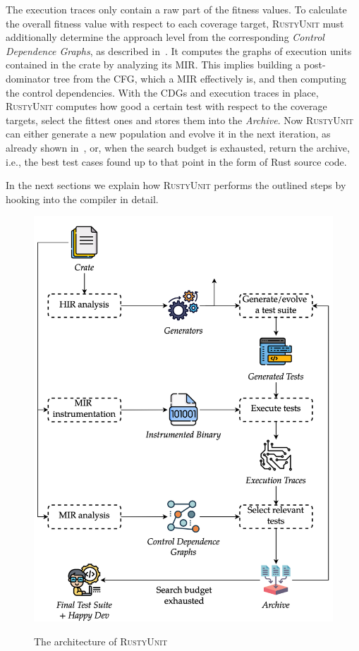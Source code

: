 \documentclass[paper=a4,%
  twoside,%
  BCOR4mm,%
  abstract=true,%
  toc=bibliography,%
  chapterprefix=true,%
  toc=bibliographynumbered,%
  open=right,%
  english,%
  pagesize=pdftex]{scrreprt}
\newcommand{\tech}{\textsc{RustyUnit}\xspace}
\newcommand{\mir}{\ac{MIR}\xspace}
\newcommand{\cfg}{\ac{CFG}\xspace}
\newcommand{\cdgs}{\acp{CDG}\xspace}
\begin{document}
The execution traces only contain a raw part of the fitness values. To calculate the overall fitness value with respect to each coverage target, \tech must additionally determine the approach level from the corresponding \emph{Control Dependence Graphs}, as described in~. It computes the graphs of execution units contained in the crate by analyzing its \mir. This implies building a post-dominator tree from the \cfg, which a \mir effectively is, and then computing the control dependencies. With the \cdgs and execution traces in place, \tech computes how good a certain test with respect to the coverage targets, select the fittest ones and stores them into the \emph{Archive}. Now \tech can either generate a new population and evolve it in the next iteration, as already shown in~, or, when the search budget is exhausted, return the archive, i.e., the best test cases found up to that point in the form of Rust source code. 

In the next sections we explain how \tech performs the outlined steps by hooking into the compiler in detail.

\begin{figure}[h!]
\caption{The architecture of \tech}
\centering
\includegraphics[width=\textwidth]{overview/overview-enhanced}
\label{fig:rustyunit-overview}
\end{figure}
\end{document}
